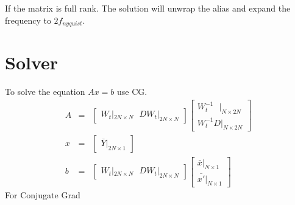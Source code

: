 \documentclass[12pt]{article}
\begin{document}
If the matrix is full rank. The solution will unwrap the alias and expand the frequency to $2f_{nyquist}$.

\section{Solver}
To solve the equation $Ax=b$ use CG.
\begin{eqnarray}
    A &=&
    \begin{bmatrix}
        W_t|_{2N\times N} ~~~ DW_t|_{2N\times N}
    \end{bmatrix}
    \begin{bmatrix}
        W_t^{-1}~~~|_{N\times 2N} \\
        W_t^{-1} D|_{N\times 2N}  
    \end{bmatrix} \\
    x &=&
    \begin{bmatrix}
        \bar{Y}|_{2N\times 1}
    \end{bmatrix} \\
    b &=&
    \begin{bmatrix}
        W_t|_{2N\times N} ~~~ DW_t|_{2N\times N}
    \end{bmatrix}
    \begin{bmatrix}
        \bar{x} |_{N\times 1} \\
        \bar{x'}|_{N\times 1}
    \end{bmatrix}
\end{eqnarray}
For Conjugate Grad
\end{document}
